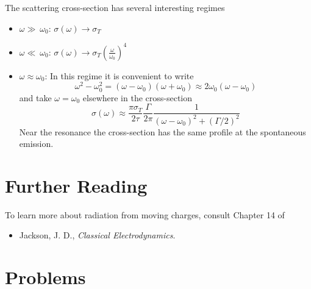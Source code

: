 The scattering cross-section has several interesting regimes
\begin{itemize}
\item $\omega \gg\ \omega_0$: $\sigma(\omega) \rightarrow \sigma_T$
\item $\omega \ll\ \omega_0$: $\sigma(\omega) \rightarrow \sigma_T
  \left (\frac{\omega}{\omega_0} \right )^4$
\item $\omega \approx \omega_0$: In this regime it is convenient to
  write 
\begin{equation}
\omega^2 - \omega_0^2 = (\omega - \omega_0) (\omega + \omega_0)
  \approx 2 \omega_0 (\omega-\omega_0)
\label{eq:263}
\end{equation}
and take $\omega=\omega_0$ elsewhere in the cross-section
\begin{equation}
\sigma(\omega) \approx \frac{\pi \sigma_T}{2\tau} 
 \frac{\Gamma}{2\pi}\frac{1}{(\omega -
  \omega_0)^2 + \left(\Gamma/2\right)^2}
\label{eq:264}
\end{equation}
Near the resonance the cross-section has the same profile at the
spontaneous emission.
\end{itemize}

\section{Further Reading}

To learn more about radiation from moving charges, consult Chapter 14
of
\begin{itemize}
\item Jackson, J. D., {\em Classical Electrodynamics}.
\end{itemize}

\section{Problems}

